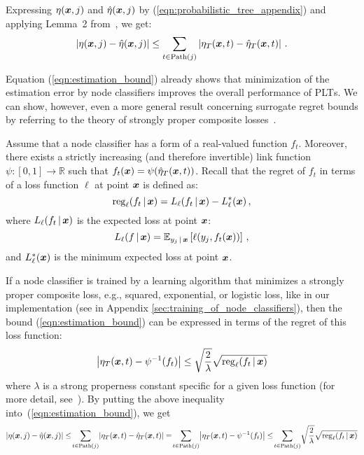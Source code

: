 \documentclass{article}
\newcommand{\Algo}[1]{\textsc{#1}}
\begin{document}
Expressing $\eta(\boldsymbol{x}, j)$  and $\hat{\eta}(\boldsymbol{x}, j)$ by (\ref{eqn:probabilistic_tree_appendix}) and applying Lemma~2 from~\cite{Beygelzimer_et_al_2009b}, we get:
\begin{equation}
\left | \eta(\boldsymbol{x}, j) - \hat{\eta}(\boldsymbol{x}, j) \right | \le \sum_{t \in \mathrm{Path}(j)} \left | \eta_T(\boldsymbol{x}, t) - \hat{\eta}_T(\boldsymbol{x}, t) \right | \,.
\label{eqn:estimation_bound}
\end{equation}

Equation (\ref{eqn:estimation_bound}) already shows that minimization of the estimation error by node classifiers improves the overall performance of \Algo{PLT}s. We can show, however, even a more general result concerning surrogate regret bounds by referring to the theory of  strongly proper composite losses~\cite{Agarwal_2014}. 

Assume that a node classifier has a form of a real-valued function $f_t$. Moreover, there exists a strictly increasing (and therefore invertible) link function $\psi: [0,1] \rightarrow \mathbb{R}$ such that $f_t(\boldsymbol{x}) = \psi(\hat{\eta}_T(\boldsymbol{x},t))$. Recall that the regret of $f_t$ in terms of a loss function $\ell$ at point $\boldsymbol{x}$ is defined as:
$$
\mathrm{reg}_{\ell}(f_t \, | \, \boldsymbol{x}) = L_{\ell}(f_t \, | \, \boldsymbol{x}) - L_{\ell}^*(\boldsymbol{x}) \,,
$$
where $L_{\ell}(f_t \, | \, \boldsymbol{x})$ is the expected loss  at  point $\boldsymbol{x}$:
$$
L_{\ell}(f \, | \, \boldsymbol{x}) = \mathbb{E}_{y_j\, | \,\boldsymbol{x}} \left [ \ell  (y_j, f_t(\boldsymbol{x})) \right ] \,,
$$
and  $L_{\ell}^*(\boldsymbol{x})$ is the minimum expected loss at point $\boldsymbol{x}$.

If a node classifier is trained by a learning algorithm that minimizes a strongly proper composite loss, e.g.,  squared, exponential, or logistic loss, like in our implementation (see in Appendix \ref{sec:training_of_node_classifiers}), then the bound (\ref{eqn:estimation_bound}) can be expressed in terms of the regret of this loss function: 
$$
\left | \eta_T(\boldsymbol{x}, t) - \psi^{-1}(f_t)  \right | \le \sqrt{ \frac{2}{\lambda}} \sqrt{\mathrm{reg}_\ell(f_t \, | \, \boldsymbol{x})}
$$
where $\lambda$ is a strong properness constant specific for a given loss function (for more detail, see~\cite{Agarwal_2014}). By putting the above inequality into~(\ref{eqn:estimation_bound}), we get
$$
\left | \eta(\boldsymbol{x}, j) - \hat{\eta}(\boldsymbol{x}, j) \right | \le \! \sum_{t \in \mathrm{Path}(j)} \! \left | \eta_T(\boldsymbol{x}, t) - \hat{\eta}_T(\boldsymbol{x}, t) \right | = \!  \sum_{t \in \mathrm{Path}(j)}  \! \left | \eta_T(\boldsymbol{x}, t) - \psi^{-1}(f_t)  \right | \le  \! \sum_{t \in \mathrm{Path}(j)}  \! \sqrt{ \frac{2}{\lambda}} \sqrt{\mathrm{reg}_\ell(f_t \, | \, \boldsymbol{x})}
$$ 
\end{document}
